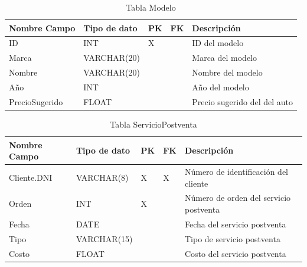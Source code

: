 \documentclass[12pt]{article}
\begin{document}
\begin{table}[htbp]
    \begin{center}
        \begin{tabular}{|p{3cm}|p{3cm}|p{1cm}|p{1cm}|p{6cm}|}
            \hline
            Nombre Campo & Tipo de dato & PK & FK & Descripción \\
            \hline
            ID & INT & X &  & ID del modelo \\
            Marca & VARCHAR(20) &  &  & Marca del modelo \\
            Nombre & VARCHAR(20) &  &  & Nombre del modelo \\
            Año & INT &  &  & Año del modelo \\
            PrecioSugerido & FLOAT &  &  & Precio sugerido del del auto\\
            \hline
        \end{tabular}
        \caption{Tabla Modelo}
        \label{tab:tablas}
    \end{center}
\end{table}


\begin{table}[htbp]
    \begin{center}
        \begin{tabular}{|p{3cm}|p{3cm}|p{1cm}|p{1cm}|p{6cm}|}
            \hline
            Nombre Campo & Tipo de dato & PK & FK & Descripción \\
            \hline
            Cliente.DNI & VARCHAR(8) & X & X & Número de identificación del cliente \\
            Orden & INT & X &  & Número de orden del servicio postventa \\
            Fecha & DATE &  &  & Fecha del servicio postventa \\
            Tipo & VARCHAR(15) &  &  & Tipo de servicio postventa \\
            Costo & FLOAT &  &  & Costo del servicio postventa \\
            \hline
        \end{tabular}
        \caption{Tabla ServicioPostventa}
        \label{tab:tablas}
    \end{center}
\end{table}
\end{document}
